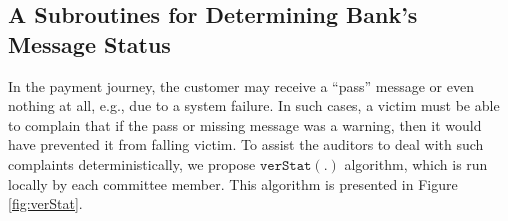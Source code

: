 
\vspace{-3mm}
\subsection{A Subroutines for Determining Bank's Message Status}
\vspace{-.5mm}
In the payment journey, the customer may receive a ``pass'' message or even nothing at all, e.g., due to a system failure. In such cases,  a victim must be able to complain that if the pass or missing message was a warning, then it would have prevented it from falling victim. To assist the auditors to deal with such complaints deterministically, we propose $\mathtt{verStat}(.)$ algorithm, which is run locally by each committee member. This algorithm is presented in Figure \ref{fig:verStat}. 


